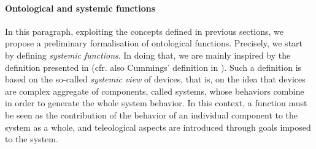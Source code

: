 \documentclass[sw]{iosart2x}
\newcommand{\firstTimeKeyWord}[1]{\textit{#1}}
\newcommand{\myComment}[1]{}
\begin{document}
\paragraph{Ontological and systemic functions}
In this paragraph, exploiting the concepts defined in previous sections, we propose a preliminary formalisation of ontological functions. 
Precisely, we start by defining \firstTimeKeyWord{systemic functions}. In doing that, we are mainly inspired by the definition presented in \cite{mizoguchiUnifyingDefinitionArtifact2016} (cfr. also Cummings' definition in \cite{cumminsFunctionalAnalysis1975}).
Such a definition is based on the so-called \firstTimeKeyWord{systemic view} of devices, that is, on the idea that devices are complex aggregate of components, called systems, whose behaviors combine in order to generate the whole system behavior. 
In this context, a function must be seen as the contribution of the behavior of an individual component to the system as a whole, and teleological aspects are introduced through goals imposed to \myComment{selected for} the system.  


\end{document}

